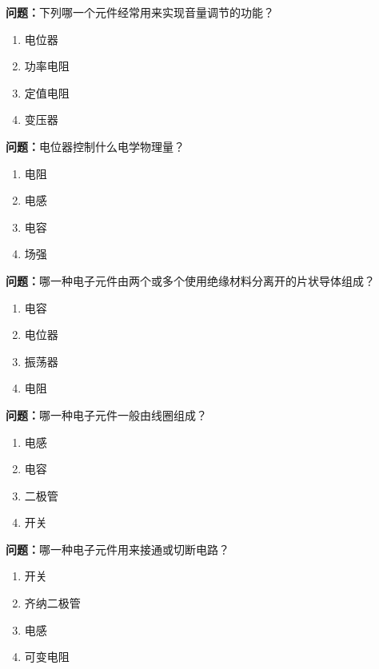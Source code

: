 \bigskip


\noindent\textbf{问题：}下列哪一个元件经常用来实现音量调节的功能？
\begin{enumerate}[label=\Alph*), leftmargin=3em]
\item 电位器
\item 功率电阻
\item 定值电阻
\item 变压器
\end{enumerate}

\bigskip


\noindent\textbf{问题：}电位器控制什么电学物理量？
\begin{enumerate}[label=\Alph*), leftmargin=3em]
\item 电阻
\item 电感
\item 电容
\item 场强
\end{enumerate}

\bigskip


\noindent\textbf{问题：}哪一种电子元件由两个或多个使用绝缘材料分离开的片状导体组成？
\begin{enumerate}[label=\Alph*), leftmargin=3em]
\item 电容
\item 电位器
\item 振荡器
\item 电阻
\end{enumerate}

\bigskip


\noindent\textbf{问题：}哪一种电子元件一般由线圈组成？
\begin{enumerate}[label=\Alph*), leftmargin=3em]
\item 电感
\item 电容
\item 二极管
\item 开关
\end{enumerate}

\bigskip


\noindent\textbf{问题：}哪一种电子元件用来接通或切断电路？
\begin{enumerate}[label=\Alph*), leftmargin=3em]
\item 开关
\item 齐纳二极管
\item 电感
\item 可变电阻
\end{enumerate}

\bigskip


